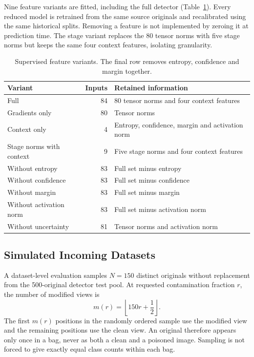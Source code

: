 Nine feature variants are fitted, including the full detector
(Table~\ref{tab:setup-ablations}). Every reduced model is retrained from
the same source originals and recalibrated using the same historical
splits. Removing a feature is not implemented by zeroing it at prediction
time. The stage variant replaces the 80 tensor norms with five stage
norms but keeps the same four context features, isolating granularity.

\begin{table}[tbp]
\centering
\small
\begin{tabularx}{\textwidth}{p{5.2cm}rX}
\toprule
Variant & Inputs & Retained information\\
\midrule
Full & 84 & 80 tensor norms and four context features\\
Gradients only & 80 & Tensor norms\\
Context only & 4 & Entropy, confidence, margin and activation norm\\
Stage norms with context & 9 & Five stage norms and four context features\\
Without entropy & 83 & Full set minus entropy\\
Without confidence & 83 & Full set minus confidence\\
Without margin & 83 & Full set minus margin\\
Without activation norm & 83 & Full set minus activation norm\\
Without uncertainty & 81 & Tensor norms and activation norm\\
\bottomrule
\end{tabularx}
\caption{Supervised feature variants. The final row removes entropy,
confidence and margin together.}
\label{tab:setup-ablations}
\end{table}

\subsection{Simulated Incoming Datasets}
\label{subsec:setup-bags}

A dataset-level evaluation samples $N=150$ distinct originals without
replacement from the 500-original detector test pool. At requested
contamination fraction $r$, the number of modified views is
\begin{equation}
    m(r)=\left\lfloor150r+\frac{1}{2}\right\rfloor.
    \label{eq:setup-rounded-count}
\end{equation}
The first $m(r)$ positions in the randomly ordered sample use the modified
view and the remaining positions use the clean view. An original therefore
appears only once in a bag, never as both a clean and a poisoned image.
Sampling is not forced to give exactly equal class counts within each bag.

